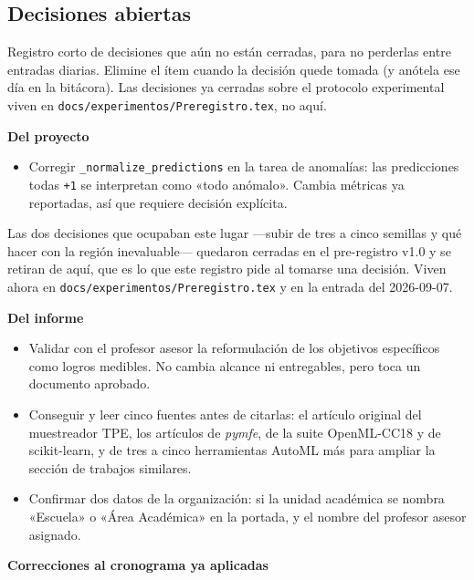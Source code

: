 \documentclass[11pt,letterpaper]{article}
\begin{document}
\subsection*{Decisiones abiertas}

Registro corto de decisiones que aún no están cerradas, para no perderlas entre
entradas diarias. Elimine el ítem cuando la decisión quede tomada (y anótela ese
día en la bitácora). Las decisiones ya cerradas sobre el protocolo experimental
viven en \texttt{docs/experimentos/Preregistro.tex}, no aquí.

\textbf{Del proyecto}

\begin{itemize}[leftmargin=1.4em]
  \item Corregir \texttt{\_normalize\_predictions} en la tarea de anomalías: las
        predicciones todas \texttt{+1} se interpretan como «todo anómalo». Cambia métricas
        ya reportadas, así que requiere decisión explícita.
\end{itemize}

Las dos decisiones que ocupaban este lugar ---subir de tres a cinco semillas y qué
hacer con la región inevaluable--- quedaron cerradas en el pre-registro v1.0 y se
retiran de aquí, que es lo que este registro pide al tomarse una decisión. Viven
ahora en \texttt{docs/experimentos/Preregistro.tex} y en la entrada del 2026-09-07.

\textbf{Del informe}

\begin{itemize}[leftmargin=1.4em]
  \item Validar con el profesor asesor la reformulación de los objetivos específicos como
        logros medibles. No cambia alcance ni entregables, pero toca un documento aprobado.
  \item Conseguir y leer cinco fuentes antes de citarlas: el artículo original del
        muestreador TPE, los artículos de \textit{pymfe}, de la suite OpenML-CC18 y de
        scikit-learn, y de tres a cinco herramientas AutoML más para ampliar la sección de
        trabajos similares.
  \item Confirmar dos datos de la organización: si la unidad académica se nombra
        «Escuela» o «Área Académica» en la portada, y el nombre del profesor asesor
        asignado.
\end{itemize}

\textbf{Correcciones al cronograma ya aplicadas}
\end{document}
